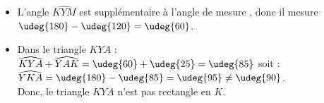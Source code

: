    \begin{itemize}
      \item L'angle $\widehat{KYM}$ est supplémentaire à l'angle de mesure , donc il mesure $\udeg{180}-\udeg{120} =\udeg{60}$.
      \item Dans le triangle $KYA$ : \\
         $\widehat{KYA}+\widehat{YAK} = \udeg{60}+\udeg{25} =\udeg{85}$ soit : \\
         $\widehat{YKA} =\udeg{180}-\udeg{85} =\udeg{95} \neq\udeg{90}$. \\
         Donc, {\blue le triangle $KYA$ n'est pas rectangle en $K$}.
   \end{itemize}
